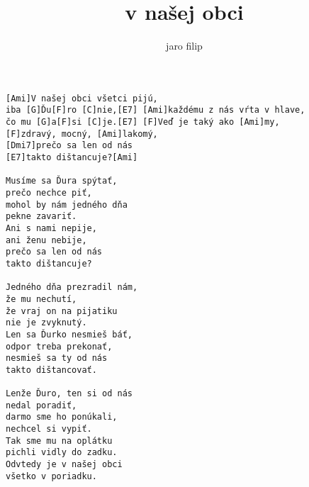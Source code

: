 \author{jaro filip}
\title{v našej obci}
\maketitle
\begin{verbatim}
[Ami]V našej obci všetci pijú, 
iba [G]Ďu[F]ro [C]nie,[E7] [Ami]každému z nás vŕta v hlave,
čo mu [G]a[F]si [C]je.[E7] [F]Veď je taký ako [Ami]my,                             
[F]zdravý, mocný, [Ami]lakomý,
[Dmi7]prečo sa len od nás
[E7]takto dištancuje?[Ami]

Musíme sa Ďura spýtať,
prečo nechce piť,
mohol by nám jedného dňa
pekne zavariť.
Ani s nami nepije,
ani ženu nebije,
prečo sa len od nás
takto dištancuje?

Jedného dňa prezradil nám,
že mu nechutí,
že vraj on na pijatiku
nie je zvyknutý.
Len sa Ďurko nesmieš báť,
odpor treba prekonať,
nesmieš sa ty od nás
takto dištancovať.

Lenže Ďuro, ten si od nás
nedal poradiť,
darmo sme ho ponúkali,
nechcel si vypiť.
Tak sme mu na oplátku
pichli vidly do zadku.
Odvtedy je v našej obci
všetko v poriadku.
\end{verbatim}
